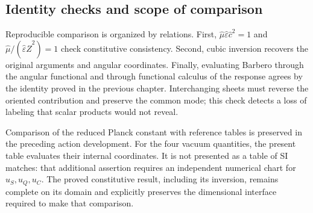 \subsection{Identity checks and scope of comparison}

Reproducible comparison is organized by relations. First,
$\widehat\mu\widehat\varepsilon\widehat c^2=1$ and
$\widehat\mu/(\widehat\varepsilon\widehat Z^2)=1$ check
constitutive consistency. Second, cubic inversion recovers
the original arguments and angular coordinates. Finally, evaluating
Barbero through the angular functional and through functional calculus
of the response agrees by the identity proved in the previous chapter.
Interchanging sheets must reverse the oriented contribution and preserve
the common mode; this check detects a loss of labeling that scalar
products would not reveal.

Comparison of the reduced Planck constant with reference
tables is preserved in the preceding action development. For the
four vacuum quantities, the present table evaluates their
internal coordinates. It is not presented as a table of SI matches:
that additional assertion requires an independent numerical chart for
$u_S,u_Q,u_C$. The proved constitutive result, including its inversion,
remains complete on its domain and explicitly preserves the dimensional
interface required to make that comparison.
